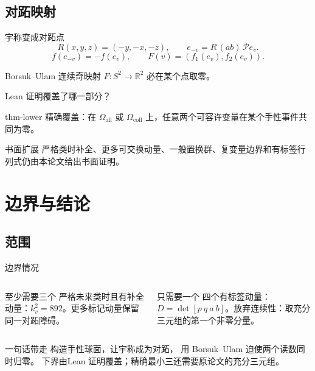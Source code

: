 \documentclass{beamer}
\begin{document}
\subsection{对跖映射}
\begin{frame}{宇称变成对跖点}
  \[
  R(x,y,z)=(-y,-x,-z),\qquad
  e_{-v}=R\,(ab)\,\mathcal P e_v.
  \]
  \[
  f(e_{-v})=-f(e_v),\qquad
  F(v)=(f_1(e_v),f_2(e_v)).
  \]
  \begin{block}{Borsuk--Ulam}
    连续奇映射 $F:S^2\to\mathbb R^2$ 必在某个点取零。
  \end{block}
\end{frame}
\begin{frame}{Lean 证明覆盖了哪一部分？}
  \begin{bookresult}{thm-lower}
    精确覆盖：在 $\Omega_{\mathrm{all}}$ 或 $\Omega_{\mathrm{coll}}$ 上，任意两个可容许变量在某个手性事件共同为零。
  \end{bookresult}
  \begin{block}{书面扩展}
    严格类时补全、更多可交换动量、一般置换群、复变量边界和有标签行列式仍由本论文给出书面证明。
  \end{block}
\end{frame}
\section{边界与结论}
\subsection{范围}
\begin{frame}{边界情况}
  \begin{columns}
      \begin{block}{至少需要三个}
        严格未来类时且有补全动量：$k_v^2=892$。更多标记动量保留同一对跖障碍。
      \end{block}
      \begin{block}{只需要一个}
        四个有标签动量：$D=\det[p\ q\ a\ b]$。放弃连续性：取充分三元组的第一个非零分量。
      \end{block}
  \end{columns}
\end{frame}
\begin{frame}{一句话带走}
  \centering
  \Large
  构造手性球面，\quad 让宇称成为对跖，\quad
  用 Borsuk--Ulam 迫使两个读数同时归零。
  \vfill
  \small
  下界由Lean 证明覆盖；精确最小三还需要原论文的充分三元组。
\end{frame}
\appendix
\FormalVerification
\end{document}
